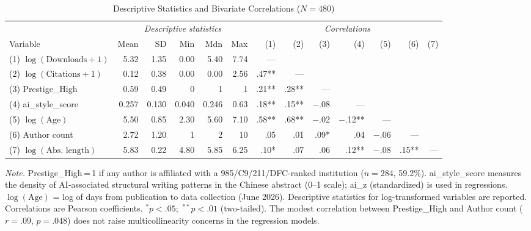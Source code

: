 \documentclass[12pt,a4paper]{article}
\begin{document}
\begin{table}[htbp]
\centering
\caption{Descriptive Statistics and Bivariate Correlations ($N = 480$)}
\label{tab:descriptives}
\begin{threeparttable}
\small
\begin{tabular}{lrrrrr|rrrrrrr}
\toprule
& \multicolumn{5}{c|}{\textit{Descriptive statistics}} &
  \multicolumn{7}{c}{\textit{Correlations}} \\
\cmidrule(lr){2-6}\cmidrule(lr){7-13}
Variable & Mean & SD & Min & Mdn & Max &
  (1) & (2) & (3) & (4) & (5) & (6) & (7) \\
\midrule
(1) $\log(\text{Downloads}+1)$ & 5.32 & 1.35 & 0.00 & 5.40 & 7.74 &
  ---  &      &     &     &     &     & \\
(2) $\log(\text{Citations}+1)$ & 0.12 & 0.38 & 0.00 & 0.00 & 2.56 &
  .47** & --- &     &     &     &     & \\
(3) Prestige\_High & 0.59 & 0.49 & 0 & 1 & 1 &
  .21** & .28** & --- &     &     &     & \\
(4) ai\_style\_score & 0.257 & 0.130 & 0.040 & 0.246 & 0.63 &
  .18** & .15** & $-$.08 & --- &     &     & \\
(5) $\log(\text{Age})$ & 5.50 & 0.85 & 2.30 & 5.60 & 7.10 &
  .58** & .68** & $-$.02 & $-$.12** & --- &     & \\
(6) Author count & 2.72 & 1.20 & 1 & 2 & 10 &
  .05  & .01  & .09* & .04   & $-$.06 & --- & \\
(7) $\log(\text{Abs. length})$ & 5.83 & 0.22 & 4.80 & 5.85 & 6.25 &
  .10* & .07  & .06  & .12** & $-$.08 & .15** & --- \\
\bottomrule
\end{tabular}
\begin{tablenotes}
\footnotesize
\item \textit{Note.} Prestige\_High\,=\,1 if any author is affiliated with a
  985/C9/211/DFC-ranked institution ($n=284$, 59.2\%).
  ai\_style\_score measures the density of AI-associated structural writing
  patterns in the Chinese abstract (0--1 scale); ai\_z (standardized) is used
  in regressions.
  $\log(\text{Age})$ = log of days from publication to data collection (June 2026).
  Descriptive statistics for log-transformed variables are reported.
  Correlations are Pearson coefficients.
  $^{*}p<.05$;\ $^{**}p<.01$ (two-tailed).
  The modest correlation between Prestige\_High and Author count
  ($r=.09$, $p=.048$) does not raise multicollinearity concerns
  in the regression models.
\end{tablenotes}
\end{threeparttable}
\end{table}
\end{document}
